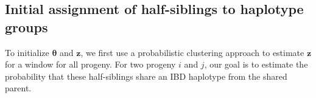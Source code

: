 \documentclass[11pt]{article}
\begin{document}
\subsection{Initial assignment of half-siblings to haplotype groups}

To initialize $\bm{\theta}$ and $\bm{z}$, we first use a probabilistic
clustering approach to estimate $\bm{z}$ for a window for all progeny. For two
progeny $i$ and $j$, our goal is to estimate the probability that these
half-siblings share an IBD haplotype from the shared parent. 


%
%
%
%
%
%
%
%
%
%
%
%
%
%
%
%
%
%
%
%
%
%
%
%
%
\end{document}
